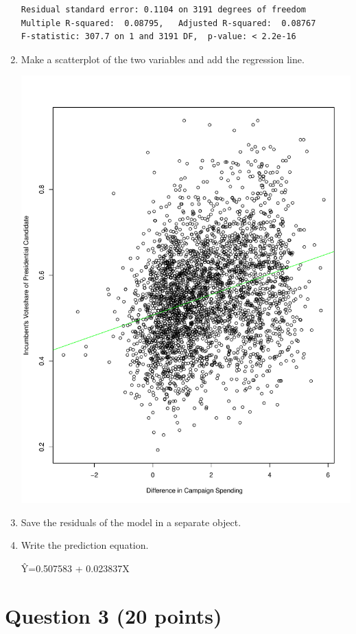 \documentclass[12pt,letterpaper]{article}
\begin{document}
\begin{enumerate}
\begin{Verbatim}
Residual standard error: 0.1104 on 3191 degrees of freedom
Multiple R-squared:  0.08795,	Adjusted R-squared:  0.08767 
F-statistic: 307.7 on 1 and 3191 DF,  p-value: < 2.2e-16
		\end{Verbatim}
		\item Make a scatterplot of the two variables and add the regression line.
		
		\includegraphics[scale=0.6]{Question 2.2.pdf}
		\item Save the residuals of the model in a separate object.
		
		\item Write the prediction equation.
		
		\^{Y}=0.507583 + 0.023837X
	\end{enumerate}
	
	\newpage	
\section*{Question 3 (20 points)}
\end{document}
